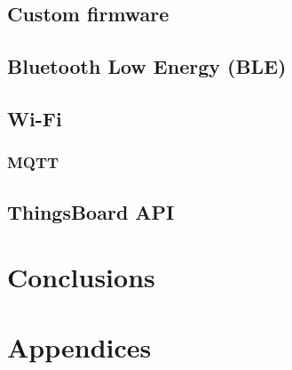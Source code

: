 \documentclass[12pt, a4paper]{scrreprt}
\begin{document}
\section{Custom firmware}
\section{Bluetooth Low Energy (BLE)}
\section{Wi-Fi}
\subsection{MQTT}
\section{ThingsBoard API}

\newpage
\chapter{Conclusions}

%

%
%
\newpage
\printbibliography[title={References}, heading=bibnumbered]

\newpage
\chapter{Appendices}
\end{document}
